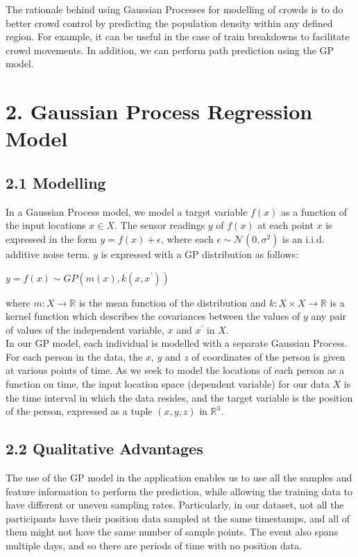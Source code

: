 \documentclass[letterpaper]{article}
\begin{document}
The rationale behind using Gaussian Processes for modelling of crowds is to do better crowd control by predicting the population density within any defined region. For example, it can be useful in the case of train breakdowns to facilitate crowd movements. In addition, we can perform path prediction using the GP model.

\section{2.  Gaussian Process Regression Model}

\subsection{2.1  Modelling}

In a Gaussian Process model, we model a target variable $f(x)$ as a function of the input locations $x \in X$. The sensor readings $y$ of $f(x)$ at each point $x$ is expressed in the form $y = f(x) + \epsilon$, where each $\epsilon \sim \mathcal{N}(0, \sigma^2)$ is an i.i.d. additive noise term. $y$ is expressed with a GP distribution as follows:

\begin{center}
$y = f(x) \sim GP(m(x), k(x,x^\prime))$
\end{center}

where $m: X \rightarrow \mathbb{R}$ is the mean function of the distribution and $k: X \times X \rightarrow \mathbb{R}$ is a kernel function which describes the covariances between the values of $y$ any pair of values of the independent variable, $x$ and $x^\prime$ in $X$. \\

In our GP model, each individual is modelled with a separate Gaussian Process. For each person in the data, the $x$, $y$ and $z$ of coordinates of the person is given at various points of time. As we seek to model the locations of each person as a function on time, the input location space (dependent variable) for our data $X$ is the time interval in which the data resides, and the target variable is the position of the person, expressed as a tuple $(x,y,z)$ in $\mathbb{R}^3$.

\subsection{2.2  Qualitative Advantages}

The use of the GP model in the application enables us to use all the samples and feature information to perform the prediction, while allowing the training data to have different or uneven sampling rates. Particularly, in our dataset, not all the participants have their position data sampled at the same timestamps, and all of them might not have the same number of sample points. The event also spans multiple days, and so there are periods of time with no position data.
\end{document}
